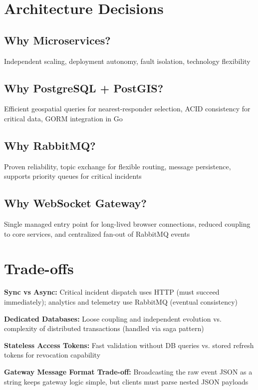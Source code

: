 \documentclass[12pt,a4paper]{report}
\begin{document}
\section{Architecture Decisions}

\subsection{Why Microservices?}
Independent scaling, deployment autonomy, fault isolation, technology flexibility

\subsection{Why PostgreSQL + PostGIS?}
Efficient geospatial queries for nearest-responder selection, ACID consistency for critical data, GORM integration in Go

\subsection{Why RabbitMQ?}
Proven reliability, topic exchange for flexible routing, message persistence, supports priority queues for critical incidents

\subsection{Why WebSocket Gateway?}
Single managed entry point for long-lived browser connections, reduced coupling to core services, and centralized fan-out of RabbitMQ events

\section{Trade-offs}

\textbf{Sync vs Async:} Critical incident dispatch uses HTTP (must succeed immediately); analytics and telemetry use RabbitMQ (eventual consistency)

\textbf{Dedicated Databases:} Loose coupling and independent evolution vs. complexity of distributed transactions (handled via saga pattern)

\textbf{Stateless Access Tokens:} Fast validation without DB queries vs. stored refresh tokens for revocation capability

\textbf{Gateway Message Format Trade-off:} Broadcasting the raw event JSON as a string keeps gateway logic simple, but clients must parse nested JSON payloads

\newpage
\end{document}
